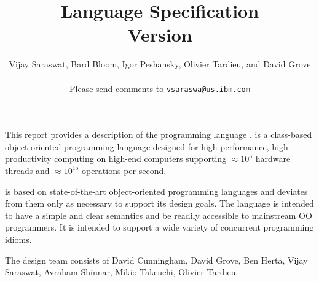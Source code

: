 
\thispagestyle{empty}


\title{ \Xten Language Specification \\
\large Version \integerversion}
\author{Vijay Saraswat, Bard Bloom, Igor Peshansky, Olivier Tardieu, and David Grove\\
\\
Please send comments to 
\texttt{vsaraswa@us.ibm.com}}

\maketitle

\newcommand\authorsc[1]{#1}

This report provides a description of the programming
language \Xten. \Xten{} is a class-based object-oriented
programming language designed for high-performance, high-productivity
computing on high-end computers supporting $\approx 10^5$ hardware threads
and $\approx 10^{15}$ operations per second. 

\Xten{} is based on state-of-the-art object-oriented programming
languages and deviates from them only as necessary to support its
design goals. The language is intended to have a simple and clear
semantics and be readily accessible to mainstream OO programmers. It
is intended to support a wide variety of concurrent programming
idioms.


The \Xten{} design team consists of
\authorsc{David Cunningham},
\authorsc{David Grove},
\authorsc{Ben Herta},
\authorsc{Vijay Saraswat},
\authorsc{Avraham Shinnar},
\authorsc{Mikio Takeuchi},
\authorsc{Olivier Tardieu}.

